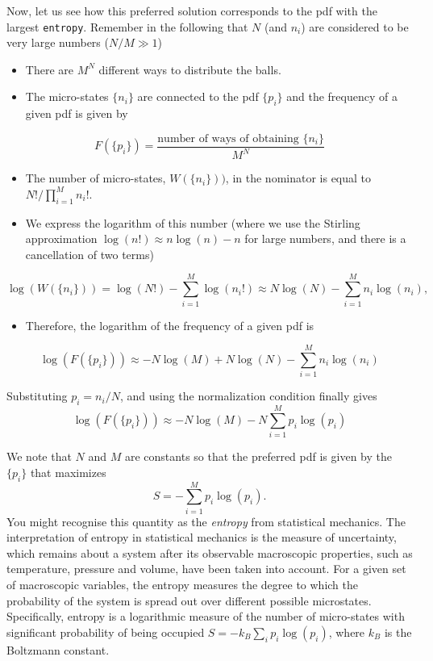 \documentclass[%
oneside,                 %
final,                   %
10pt]{article}
\begin{document}
\noindent
Now, let us see how this preferred solution corresponds to the pdf with the largest \texttt{entropy}. Remember in the following that $N$ (and $n_i$) are considered to be very large numbers ($N/M \gg 1$)

\begin{itemize}
\item There are $M^N$ different ways to distribute the balls.

\item The micro-states $\{ n_i\}$ are connected to the pdf $\{ p_i \}$ and the frequency of a given pdf is given by
\end{itemize}

\noindent
\[
F(\{p_i\}) = \frac{\text{number of ways of obtaining } \{n_i\}}{M^N}
\]
\begin{itemize}
\item The number of micro-states, $W(\{n_i\}))$, in the nominator is equal to $N! / \prod_{i=1}^M n_i!$. 

\item We express the logarithm of this number (where we use the Stirling approximation $\log(n!) \approx n\log(n) - n$ for large numbers, and there is a cancellation of two terms)
\end{itemize}

\noindent
\[
\log(W(\{n_i\})) = \log(N!) − \sum_{i=1}^M \log(n_i!) 
\approx N\log(N) - \sum_{i=1}^M n_i\log(n_i),
\]

\begin{itemize}
\item Therefore, the logarithm of the frequency of a given pdf is
\end{itemize}

\noindent
\[
\log(F(\{p_i\})) \approx -N \log(M) + N\log(N) - \sum_{i=1}^M n_i\log(n_i)
\]

Substituting $p_i = n_i/N$, and using the normalization condition finally gives
\[
\log(F(\{p_i\})) \approx -N \log(M) - N \sum_{i=1}^M p_i\log(p_i)
\]

We note that $N$ and $M$ are constants so that the preferred pdf is given by the $\{ p_i \}$ that maximizes
\[
S = - \sum_{i=1}^M p_i\log(p_i).
\]
You might recognise this quantity as the \emph{entropy} from statistical mechanics. The interpretation of entropy in statistical mechanics is the measure of uncertainty, which remains about a system after its observable macroscopic properties, such as temperature, pressure and volume, have been taken into account. For a given set of macroscopic variables, the entropy measures the degree to which the probability of the system is spread out over different possible microstates. Specifically, entropy is a logarithmic measure of the number of micro-states with significant probability of being occupied $S = -k_B \sum_i p_i \log(p_i)$, where $k_B$ is the Boltzmann constant.
\end{document}
